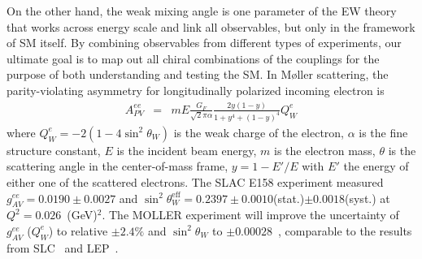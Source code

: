 On the other hand, the weak mixing angle is one parameter of the EW theory that works across energy scale and link all observables, but only in the framework of SM itself.  %
By combining observables from different types of experiments, our ultimate goal is to map out all chiral combinations of the couplings for the purpose of both understanding and testing the SM. In M{\o}ller scattering, the parity-violating asymmetry for longitudinally polarized incoming electron is 
\begin{eqnarray}
 A_{PV}^{ee} &=& m E \frac{G_F}{\sqrt{2}\pi\alpha}\frac{2y(1-y)}{1+y^4+(1-y)^4}Q_W^e
\end{eqnarray}
where $Q_W^e=-2(1-4\sin^2\theta_W)$ is the weak charge of the electron, $\alpha$ is the fine structure constant, $E$ is the incident beam energy, $m$ is the electron mass, $\theta$ is the scattering angle in the center-of-mass frame, $y=1-E'/E$ with $E'$ the energy of either one of the scattered electrons. The SLAC E158 experiment measured %
$g^{ee}_{AV} = 0.0190 \pm 0.0027$ and $\sin^2\theta_W^\mathrm{eff}=0.2397\pm 0.0010$(stat.)$\pm 0.0018$(syst.) at $Q^2=0.026$~(GeV)$^2$. The MOLLER experiment will improve the uncertainty of $g_{AV}^{ee}$ ($Q_W^e$) to %
relative $\pm 2.4\%$ and $\sin^2\theta_W$ to $\pm 0.00028$~\cite{MOLLERCDR}, comparable to 
the results from SLC~\cite{SLD:2000leq} and 
LEP~\cite{ALEPH:2005ab}.


